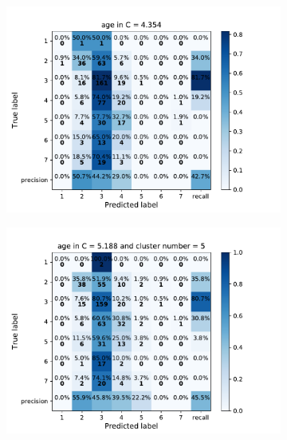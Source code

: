 {\begin{figure}[h]
    \centering
    \begin{subfigure}
      \centering
      \includegraphics[scale=0.45]{fig/super_lr_age.pdf}
    \end{subfigure}%
    \begin{subfigure}
      \centering
      \includegraphics[scale=0.45]{fig/kms_lr_age.pdf}
    \end{subfigure}
\end{figure}

}
